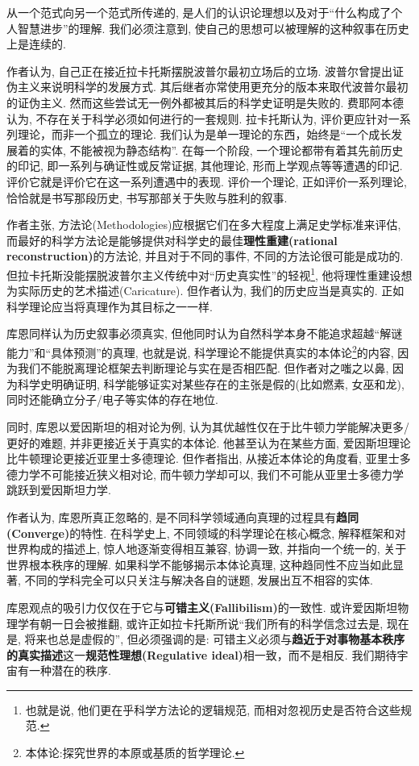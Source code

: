 \documentclass[12pt, a4paper, oneside]{ctexart}
\renewcommand{\b}{\textbf}
\newcommand{\f}{\footnote}
\begin{document}
从一个范式向另一个范式所传递的, 是人们的认识论理想以及对于``什么构成了个人智慧进步''的理解. 我们必须注意到, 使自己的思想可以被理解的这种叙事在历史上是连续的. 

作者认为, 自己正在接近拉卡托斯摆脱波普尔最初立场后的立场. 波普尔曾提出证伪主义来说明科学的发展方式. 其后继者亦常使用更充分的版本来取代波普尔最初的证伪主义. 然而这些尝试无一例外都被其后的科学史证明是失败的. 费耶阿本德认为, 不存在关于科学必须如何进行的一套规则. 拉卡托斯认为, 评价更应针对一系列理论，而非一个孤立的理论. 我们认为是单一理论的东西，始终是``一个成长发展着的实体, 不能被视为静态结构''. 在每一个阶段, 一个理论都带有着其先前历史的印记, 即一系列与确证性或反常证据, 其他理论, 形而上学观点等等遭遇的印记.评价它就是评价它在这一系列遭遇中的表现. 评价一个理论, 正如评价一系列理论, 恰恰就是书写那段历史, 书写那部关于失败与胜利的叙事.

作者主张, 方法论(Methodologies)应根据它们在多大程度上满足史学标准来评估, 而最好的科学方法论是能够提供对科学史的最佳\b{理性重建(rational reconstruction)}的方法论, 并且对于不同的事件, 不同的方法论很可能是成功的. 但拉卡托斯没能摆脱波普尔主义传统中对``历史真实性''的轻视\f{也就是说, 他们更在乎科学方法论的逻辑规范, 而相对忽视历史是否符合这些规范.}, 他将理性重建设想为实际历史的艺术描述(Caricature). 但作者认为, 我们的历史应当是真实的. 正如科学理论应当将真理作为其目标之一一样.

库恩同样认为历史叙事必须真实, 但他同时认为自然科学本身不能追求超越``解谜能力''和``具体预测''的真理, 也就是说, 科学理论不能提供真实的本体论\f{本体论:探究世界的本原或基质的哲学理论.}的内容, 因为我们不能脱离理论框架去判断理论与实在是否相匹配. 但作者对之嗤之以鼻, 因为科学史明确证明, 科学能够证实对某些存在的主张是假的(比如燃素, 女巫和龙), 同时还能确立分子/电子等实体的存在地位. 

同时, 库恩以爱因斯坦的相对论为例, 认为其优越性仅在于比牛顿力学能解决更多/更好的难题, 并非更接近关于真实的本体论. 他甚至认为在某些方面, 爱因斯坦理论比牛顿理论更接近亚里士多德理论. 但作者指出, 从接近本体论的角度看, 亚里士多德力学不可能接近狭义相对论, 而牛顿力学却可以, 我们不可能从亚里士多德力学跳跃到爱因斯坦力学. 

作者认为, 库恩所真正忽略的, 是不同科学领域通向真理的过程具有\b{趋同(Converge)}的特性. 在科学史上, 不同领域的科学理论在核心概念, 解释框架和对世界构成的描述上, 惊人地逐渐变得相互兼容, 协调一致, 并指向一个统一的, 关于世界根本秩序的理解. 如果科学不能够揭示本体论真理, 这种趋同性不应当如此显著, 不同的学科完全可以只关注与解决各自的谜题, 发展出互不相容的实体. 

库恩观点的吸引力仅仅在于它与\b{可错主义(Fallibilism)}的一致性. 或许爱因斯坦物理学有朝一日会被推翻, 或许正如拉卡托斯所说``我们所有的科学信念过去是, 现在是, 将来也总是虚假的'', 但必须强调的是: 可错主义必须与\b{趋近于对事物基本秩序的真实描述}这一\b{规范性理想(Regulative ideal)}相一致，而不是相反. 我们期待宇宙有一种潜在的秩序. 
\end{document}
